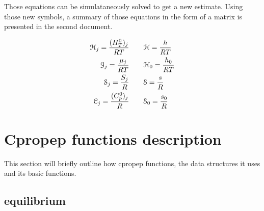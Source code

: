 \documentclass[10pt]{article}
\begin{document}
Those equations can be simulataneously solved to get a new
estimate. Using those new symbols, a summary of those equations in the
form of a matrix is presented in the second document.

\begin{alignat}{4}
\EuScript{H}_j = \frac{(H_T^0)_j}{RT} & \qquad \EuScript{H}   = \frac{h}{RT} \\
\EuScript{G}_j = \frac{\mu_j}{RT} & \qquad \EuScript{H}_0 = \frac{h_0}{RT} \\
\EuScript{S}_j = \frac{S_j}{R} & \qquad \EuScript{S}   = \frac{s}{R}\\
\EuScript{C}_j = \frac{(C_p^0)_j}{R} & \qquad \EuScript{S}_0 = \frac{s_0}{R}
\end{alignat}

\section{Cpropep functions description}

This section will briefly outline how cpropep functions, the data structures it uses and its basic functions.

\subsection{equilibrium}
\end{document}
